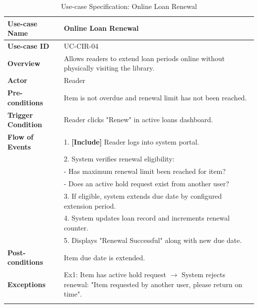 \newpage
\begin{longtable}{|p{3.5cm}|p{11.5cm}|}
    \hline
    \textbf{Use-case Name} & \textbf{Online Loan Renewal} \\
    \hline
    \textbf{Use-case ID} & UC-CIR-04 \\
    \hline
    \textbf{Overview} & Allows readers to extend loan periods online without physically visiting the library. \\
    \hline
    \textbf{Actor} & Reader \\
    \hline
    \textbf{Pre-conditions} & Item is not overdue and renewal limit has not been reached. \\
    \hline
    \textbf{Trigger Condition} & Reader clicks "Renew" in active loans dashboard. \\
    \hline
    \textbf{Flow of Events} & 
    1. \textbf{[Include]} Reader logs into system portal.\\ 
 & 
    2. System verifies renewal eligibility:\\ 
 & 
    - Has maximum renewal limit been reached for item?\\ 
 & 
    - Does an active hold request exist from another user?\\ 
 & 
    3. If eligible, system extends due date by configured extension period.\\ 
 & 
    4. System updates loan record and increments renewal counter.\\ 
 & 
    5. Displays "Renewal Successful" along with new due date. \\
    \hline
    \textbf{Post-conditions} & Item due date is extended. \\
    \hline
    \textbf{Exceptions} & 
    Ex1: Item has active hold request $\rightarrow$ System rejects renewal: "Item requested by another user, please return on time". \\
    \hline
    \caption{Use-case Specification: Online Loan Renewal} \\
\end{longtable}

